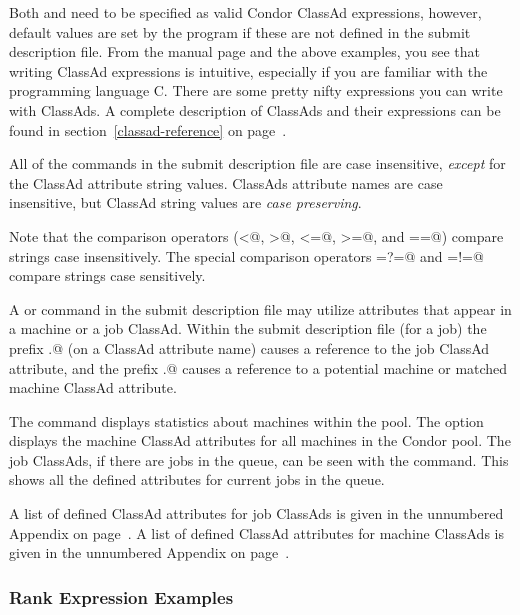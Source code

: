Both  and  need to be specified 
as valid Condor ClassAd expressions, however, default values are set by the
 program if these are not defined in the submit description file.
From the  manual page and the above examples, you see
that writing ClassAd expressions is intuitive, especially if you
are familiar with the programming language C.  There are some
pretty nifty expressions you can write with ClassAds.
A complete description of ClassAds and their expressions
can be found in section~\ref{classad-reference} on 
page~\pageref{classad-reference}.

All of the commands in the submit description file are case insensitive, 
\emph{except} for the ClassAd attribute string values.
ClassAds attribute names are
case insensitive, but ClassAd string
values are \emph{case preserving}.

Note that the comparison operators
(\verb@<@, \verb@>@, \verb@<=@, \verb@>=@, and \verb@==@)
compare strings
case insensitively.  The special comparison operators 
\verb@=?=@ and \verb@=!=@
compare strings case sensitively.

A   or  command in
the submit description file may utilize attributes
that appear in a machine or a job ClassAd.
Within the submit description file (for a job) the
prefix \verb@MY.@ (on a ClassAd attribute name)
causes a reference to the job ClassAd attribute,
and the prefix \verb@TARGET.@ causes a reference to 
a potential machine or matched machine ClassAd attribute.

The  command displays
statistics about machines within the pool.
The  option displays the
machine ClassAd attributes for all machines in the Condor pool.
The job ClassAds, if there are jobs in the queue, can be seen
with the  command.
This shows all the defined attributes for current jobs in the queue.

A list of defined ClassAd attributes for job ClassAds
is given in the unnumbered Appendix on 
page~\pageref{sec:Job-ClassAd-Attributes}.
A list of defined ClassAd attributes for machine ClassAds
is given in the unnumbered Appendix on 
page~\pageref{sec:Machine-ClassAd-Attributes}.


\subsubsection{\label{rank-examples}Rank Expression Examples}

